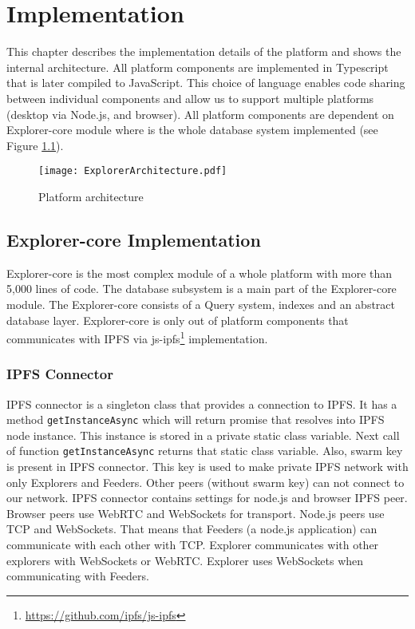 \chapter{Implementation}
\label{Implementation}
This chapter describes the implementation details of the platform and shows the internal architecture. All platform components are implemented in Typescript that is later compiled to JavaScript. This choice of language enables code sharing between individual components and allow us to support multiple platforms (desktop via Node.js, and browser). All platform components are dependent on Explorer-core module where is the whole database system implemented (see Figure \ref{systemArchitecture}). 


\begin{figure}[h]
    \centering
    \texttt{[image: ExplorerArchitecture.pdf]}
    \caption{Platform architecture}
    \label{systemArchitecture}
\end{figure}


\section{Explorer-core Implementation}
Explorer-core is the most complex module of a whole platform with more than 5,000 lines of code. The database subsystem is a main part of the Explorer-core module. The Explorer-core consists of a Query system, indexes and an abstract database layer. Explorer-core is only out of platform components that communicates with IPFS via js-ipfs\footnote{\url{https://github.com/ipfs/js-ipfs}} implementation.

\subsection{IPFS Connector}
IPFS connector is a singleton class that provides a connection to IPFS. It has a method \texttt{getInstanceAsync} which will return promise that resolves into IPFS node instance. This instance is stored in a private static class variable. Next call of function \texttt{getInstanceAsync} returns that static class variable.
Also, swarm key is present in IPFS connector. This key is used to make private IPFS network with only Explorers and Feeders. Other peers (without swarm key) can not connect to our network. IPFS connector contains settings for node.js and browser IPFS peer. Browser peers use WebRTC and WebSockets for transport. Node.js peers use TCP and WebSockets. That means that Feeders (a node.js application) can communicate with each other with TCP. Explorer communicates with other explorers with WebSockets or WebRTC. Explorer uses WebSockets when communicating with Feeders.

